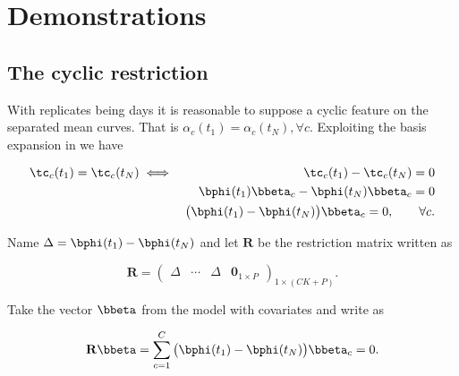 \chapter{Demonstrations}




\section{The cyclic restriction}
\label{sec:alpha_restriction}

With replicates being days it is reasonable to suppose a cyclic feature on the separated mean curves. That is $\alpha_c(t_1) = \alpha_c(t_N), \forall c$. Exploiting the basis expansion in  we have

\begin{eqnarray}
  \tc_c(t_1) = \tc_c(t_N)
  &\iff &\tc_c(t_1) - \tc_c(t_N) =0 \nonumber \\
  & & \bphi(t_1) \bbeta_c - \bphi(t_N) \bbeta_c  = 0 \nonumber \\
  & &\big(\bphi(t_1) - \bphi(t_N) \big) \bbeta_c = 0, \qquad \forall c.
  \label{eq:ap1}
\end{eqnarray}

\noindent Name $\Delta = \bphi(t_1) - \bphi(t_N)$ and let $\mathbf{R}$ be the restriction matrix written as

\begin{equation}
  \label{eq:ap2}
  \mathbf{R}
  =
  \begin{pmatrix}
    \Delta & \cdots & \Delta & \mathbf{0}_{1 \times P}
  \end{pmatrix}_{1 \times (CK+P)}.
\end{equation}

\noindent Take the vector $\bbeta$ from the model with covariates and write  as

\begin{equation}
  \label{eq:ap3}
  \mathbf{R} \bbeta = \sum_{c=1}^C \big(\bphi(t_1) - \bphi(t_N) \big) \bbeta_c = 0.
\end{equation}

